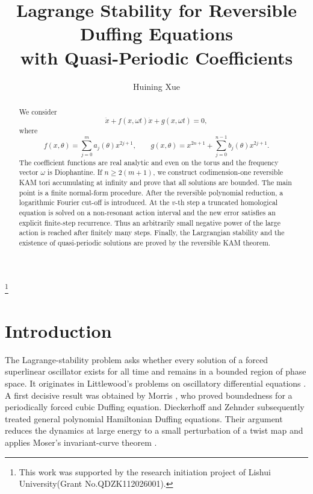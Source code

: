 \documentclass[11pt]{amsart}
\title[Reversible Duffing equations]{Lagrange Stability for Reversible Duffing Equations\\
with Quasi-Periodic Coefficients}
\author{Huining Xue}
\theoremstyle{remark}
\begin{document}
\begin{abstract}
We consider
\[
 \ddot x+f(x,\omega t)\dot x+g(x,\omega t)=0,
\]
where
\[
 f(x,\theta)=\sum_{j=0}^{m}a_j(\theta)x^{2j+1},\qquad
 g(x,\theta)=x^{2n+1}+\sum_{j=0}^{n-1}b_j(\theta)x^{2j+1}.
\]
The coefficient functions are real analytic and even on the torus and the
frequency vector $\omega$ is Diophantine.  If $n\geq2(m+1)$, we construct
codimension-one reversible KAM tori accumulating at infinity and prove that
all solutions are bounded.  The main point is a finite normal-form procedure.
After the reversible polynomial reduction, a logarithmic Fourier cut-off is
introduced.  At the $v$-th step a truncated homological equation is solved on
a non-resonant action interval and the new error satisfies an explicit
finite-step recurrence.  Thus an arbitrarily small negative power of the large
action is reached after finitely many steps. Finally, the Largrangian stability and the existence of quasi-periodic solutions are proved by the reversible KAM theorem.
\end{abstract}

\thanks{This work was supported by the research initiation project of Lishui University(Grant No.QDZK112026001).}
\maketitle

\section{Introduction}
The Lagrange-stability problem asks whether every solution of a forced
superlinear oscillator exists for all time and remains in a bounded region
of phase space.  It originates in Littlewood's problems on oscillatory
differential equations \cite{Littlewood}.  A first decisive result was
obtained by Morris \cite{Morris}, who proved boundedness for a periodically
forced cubic Duffing equation.  Dieckerhoff and Zehnder
\cite{DieckerhoffZehnder} subsequently treated general polynomial
Hamiltonian Duffing equations.  Their argument reduces the dynamics at
large energy to a small perturbation of a twist map and applies Moser's
invariant-curve theorem \cite{Moser1962}.
\end{document}
